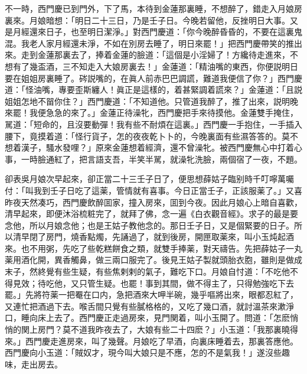不一時，西門慶已到門外，下了馬，本待到金蓮那裏睡，不想醉了，錯走入月娘房裏來。月娘暗想：「明日二十三日，乃是壬子日。今晚若留他，反挫明日大事。又是月經還來日子，也至明日潔淨。」對西門慶道：「你今晚醉昏昏的，不要在這裏鬼混。我老人家月經還未淨，不如在別房去睡了，明日來罷！」把西門慶帶笑的推出來。走到金蓮那裏去了，捧着金蓮的臉道：「這個是小淫婦了！方纔待走進來，不想有了幾盃酒，三不知走入大娘房裏去！」金蓮道：「精油嘴的東西，你便説明日要在姐姐房裏睡了。硶説嘴的，在眞人前赤巴巴調謊，難道我便信了你？」西門慶道：「怪油嘴，專要歪斯纏人！眞正是這樣的，着甚緊調着謊來？」金蓮道：「且説姐姐怎地不㽞你住？」西門慶道：「不知道他。只管道我醉了，推了出來，説明晚來罷！我便急急的來了。」金蓮正待澡牝，西門慶把手來待摸他。金蓮雙手掩住，駡道：「短命的，且沒要動彈！我有些不耐煩在這裏。」西門慶一手抱住，一手插入腰下，竟摸着道：「怪行貨子，怎的夜夜乾卜卜的，今晚裏面有些濕答答的。莫不想着漢子，騷水發哩？」原來金蓮想着經濟，還不曾澡牝。被西門慶無心中打着心事，一時臉通紅了，把言語支吾，半笑半駡，就澡牝洗臉，兩個宿了一夜，不題。

卻表吳月娘次早起來，卻正當二十三壬子日了，便思想薛姑子臨别時千叮嚀萬囑付：「叫我到壬子日吃了這薬，管情就有喜事。今日正當壬子，正該服薬了。」又喜昨夜天然凑巧，西門慶飲醉囬家，撞入房來，囬到今夜。因此月娘心上暗自喜歡，清早起來，即便沐浴梳粧完了，就拜了佛，念一遍《白衣觀音經》。求子的最是要念他，所以月娘念他；也是王姑子教他念的。那日壬子日，又是個緊要的日子。所以清早閉了房門，燒香點燭，先誦過了，就到後房，開匣取薬來，叫小玉炖起酒來。也不用粥，先吃了些乾糕餅食之類，就雙手捧薬，對天禱告。先把薛姑子一丸薬用酒化開，異香觸鼻，做三兩口服完了。後見王姑子製就頭胎衣胞，雖則是做成末子，然終覺有些生疑，有些焦剌剌的氣子，難吃下口。月娘自忖道：「不吃他不得見效；待吃他，又只管生疑。也罷！事到其間，做不得主了，只得勉強吃下去罷。」先將符薬一把罨在口内，急把酒來大呷半碗，幾乎嘔將出來，眼都忍紅了，又連忙把酒過下去。喉舌間只覺有些膩格格的，又吃了幾口酒，就討溫茶來漱淨口，睡向床上去了。西門慶正走過房來，見門関着，叫小玉開了。問道：「怎麽悄悄的関上房門？莫不道我昨夜去了，大娘有些二十四麽？」小玉道：「我那裏曉得來。」西門慶走進房來，叫了幾聲。月娘吃了早酒，向裏床睡着去，那裏答應他。西門慶向小玉道：「賊奴才，現今叫大娘只是不應，怎的不是氣我！」遂沒些趣味，走出房去。


